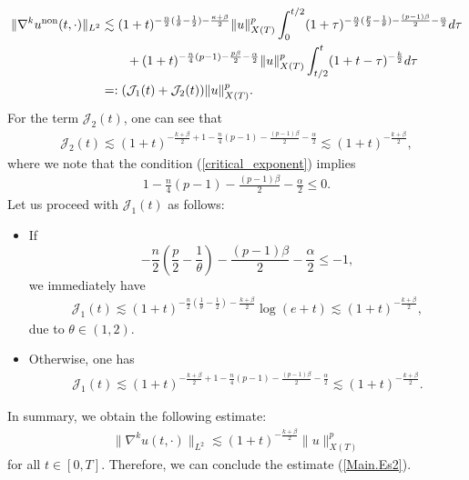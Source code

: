 \documentclass[11pt,reqno]{amsart}
\begin{document}
    \begin{align*}
        \|\nabla^k u^{\rm non}(t,\cdot)\|_{L^2} &\lesssim (1+t)^{-\frac{n}{2}(\frac{1}{\theta}-\frac{1}{2})-\frac{\kappa+\beta}{2}} \|u\|_{X(T)}^p\int_0^{t/2} (1+\tau)^{-\frac{n}{2}(\frac{p}{2}-\frac{1}{\theta})-\frac{(p-1)\beta}{2}-\frac{\alpha}{2}} d\tau\\
        &\qquad + (1+t)^{-\frac{n}{4}(p-1)-\frac{p\beta}{2}-\frac{\alpha}{2}} \|u\|_{X(T)}^p \int_{t/2}^t (1+t-\tau)^{-\frac{k}{2}} d\tau\\
        &=: (\mathcal{J}_1(t) + \mathcal{J}_2(t)) \|u\|_{X(T)}^p.
    \end{align*}
    For the term $\mathcal{J}_2(t)$, one can see that
    \begin{align*}
        \mathcal{J}_2(t) \lesssim (1+t)^{-\frac{k+\beta}{2}+1-\frac{n}{4}(p-1)-\frac{(p-1)\beta}{2}-\frac{\alpha}{2}}  \lesssim (1+t)^{-\frac{k+\beta}{2}},
    \end{align*}
    where we note that the condition (\ref{critical_exponent}) implies
    \begin{align*}
        1-\frac{n}{4}(p-1)-\frac{(p-1)\beta}{2}-\frac{\alpha}{2} \leq 0.
    \end{align*}
   Let us proceed with $\mathcal{J}_1(t)$ as follows:
   \begin{itemize}
   [leftmargin=*]
       \item If $$-\frac{n}{2}\left(\frac{p}{2}-\frac{1}{\theta}\right)-\frac{(p-1)\beta}{2}-\frac{\alpha}{2} \leq -1,$$ we immediately have
       \begin{align*}
           \mathcal{J}_1(t) \lesssim (1+t)^{-\frac{n}{2}(\frac{1}{\theta}-\frac{1}{2})-\frac{k+\beta}{2}} \log(e+t) \lesssim (1+t)^{-\frac{k+\beta}{2}},
       \end{align*}
       due to $\theta \in (1,2)$.
   
   \item Otherwise, one has
   \begin{align*}
       \mathcal{J}_1(t) \lesssim (1+t)^{-\frac{k+\beta}{2}+1-\frac{n}{4}(p-1)-\frac{(p-1)\beta}{2}-\frac{\alpha}{2}} \lesssim (1+t)^{-\frac{k+\beta}{2}}.
   \end{align*}
   \end{itemize}
   In summary, we obtain the following estimate:
   \begin{align*}
       \|\nabla^k u(t,\cdot)\|_{L^2} \lesssim (1+t)^{-\frac{k+\beta}{2}} \|u\|_{X(T)}^p
   \end{align*}
   for all $t \in [0,T]$. Therefore, we can conclude the estimate (\ref{Main.Es2}).
\end{document}
